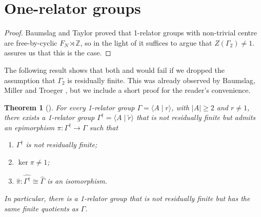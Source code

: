 \documentclass[11pt, a4 paper]{amsart}
\numberwithin{equation}{section}
\newtheorem{theorem}{Theorem}[section]
\theoremstyle{remark}
\theoremstyle{definition}
\def\Z{\mathbb Z}
\def\G{\Gamma}
\def\wh{\widehat}
\def\G{\Gamma}
\def\<{\langle}
\def\>{\rangle}
\begin{document}
\section{One-relator groups}
\label{s:1-relator}

\thmonerelator*

\begin{proof} 
	Baumslag and Taylor \cite{baumslag1967centre} 
	proved that 1-relator groups with non-trivial centre 
	are free-by-cyclic $F_N\rtimes\Z$, 
	so in the light of  
	it suffices to argue that $Z(\G_2)\neq 1$. 
	 assures us that this is the case. 
\end{proof}

The following result shows that 
both  and  would fail 
if we dropped the assumption that $\G_2$ is residually finite. This was already observed by Baumslag, Miller and Troeger \cite{BaumMillerTroeger}, but we include a short proof for the reader's convenience.

\begin{theorem} [\cite{BaumMillerTroeger}]
	For every 1-relator group $\G= \<A\mid r\>$, with $|A|\ge 2$ and $r\neq 1$, there exists a 1-relator group  $\G^\dagger = \< A\mid \tilde{r}\>$ that is not residually finite but admits an epimorphism $\pi: \G^\dagger \to \G$ such that
	\begin{enumerate}
		\item $\G^\dagger$ is not residually finite;
		\item $\ker\pi\neq 1$;
		\item $\wh{\pi}:\wh{\G^\dagger}\cong\wh{\G}$ is an isomorphism.
	\end{enumerate} 
	In particular, there is a 1-relator group that is not residually finite but has the same finite quotients as $\G$. 
\end{theorem}
\end{document}
